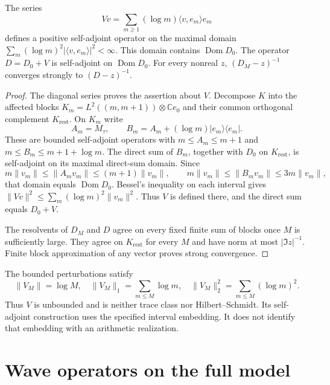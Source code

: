 \begin{proposition}
\label{v4-arith:sc:full-domain}
The series
\[
 Vv=\sum_{m\ge1}(\log m)\langle v,e_m\rangle e_m
\]
defines a positive self-adjoint operator on the maximal domain
$\sum_m(\log m)^2|\langle v,e_m\rangle|^2<\infty$.
This domain contains $\operatorname{Dom}D_0$.
The operator $D=D_0+V$ is self-adjoint on $\operatorname{Dom}D_0$.
For every nonreal $z$, $(D_M-z)^{-1}$ converges strongly to
$(D-z)^{-1}$.
\end{proposition}
\begin{proof}
The diagonal series proves the assertion about $V$.
Decompose $K$ into the affected blocks
$K_m=L^2((m,m+1))\otimes\mathbb Ce_0$ and their common orthogonal
complement $K_{\mathrm{rest}}$. On $K_m$ write
\[
 A_m=M_\tau,\qquad
 B_m=A_m+(\log m)|e_m\rangle\langle e_m|.
\]
These are bounded self-adjoint operators with
$m\le A_m\le m+1$ and $m\le B_m\le m+1+\log m$.
The direct sum of $B_m$, together with $D_0$ on $K_{\mathrm{rest}}$,
is self-adjoint on its maximal direct-sum domain.
Since
\[
 m\|v_m\|\le\|A_mv_m\|\le(m+1)\|v_m\|,
 \qquad
 m\|v_m\|\le\|B_mv_m\|\le3m\|v_m\|,
\]
that domain equals $\operatorname{Dom}D_0$.
Bessel's inequality on each interval gives
$\|Vv\|^2\le\sum_m(\log m)^2\|v_m\|^2$.
Thus $V$ is defined there, and the direct sum equals $D_0+V$.

The resolvents of $D_M$ and $D$ agree on every fixed finite sum
of blocks once $M$ is sufficiently large. They agree on
$K_{\mathrm{rest}}$ for every $M$ and have norm at most $|\Im z|^{-1}$.
Finite block approximation of any vector proves strong convergence.
\end{proof}

The bounded perturbations satisfy
\[
 \|V_M\|=\log M,\quad
 \|V_M\|_1=\sum_{m\le M}\log m,\quad
 \|V_M\|_2^2=\sum_{m\le M}(\log m)^2.
\]
Thus $V$ is unbounded and is neither trace class nor Hilbert--Schmidt.
Its self-adjoint construction uses the specified interval embedding.
It does not identify that embedding with an arithmetic realization.

\section{Wave operators on the full model}


